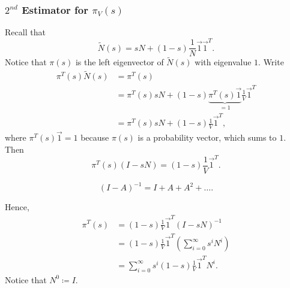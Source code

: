 \subsubsection{\(2^{nd}\) Estimator for \(\pi_V(s)\)}
Recall that
\[
	\widetilde{N}(s) = sN+(1-s)\frac{1}{N}\vec{1}\vec{1}^{T}.
\]
Notice that \(\pi(s)\) is the left eigenvector of \(\widetilde{N}(s)\) with eigenvalue \(1\). Write
\[
	\begin{split}
		\pi^{T}(s)\widetilde{N}(s) &= \pi^{T}(s) \\
		&= \pi^{T}(s)sN+(1 - s)\underbrace{\pi^{T}(s)\vec{1}}_{ = 1}\frac{1}{V}\vec{1}^{T}\\
		&= \pi^{T}(s)sN+(1 - s)\frac{1}{V}\vec{1}^{T},
	\end{split}
\]
where \(\pi^{T}(s)\vec{1} = 1\) because \(\pi(s)\) is a probability vector, which sums to \(1\). Then
\[
	\pi^{T}(s)(I - sN) = (1 - s)\frac{1}{V}\vec{1}^{T}.
\]
\begin{prev}
	\[
		(I - A)^{-1} = I + A + A^2 + \ldots .
	\]
\end{prev}
Hence,
\[
	\begin{split}
		\pi^{T}(s) &= (1 - s)\frac{1}{V}\vec{1}^{T}(I - sN)^{-1}\\
		&= (1 - s)\frac{1}{V}\vec{1}^{T}\left(\sum\limits_{i=0}^{\infty} s^i N^i\right)\\
		&= \sum\limits_{i=0}^{\infty} s^i (1 - s)\frac{1}{V}\vec{1}^{T}N^i.
	\end{split}
\]
Notice that \(N^0\coloneqq I\).

